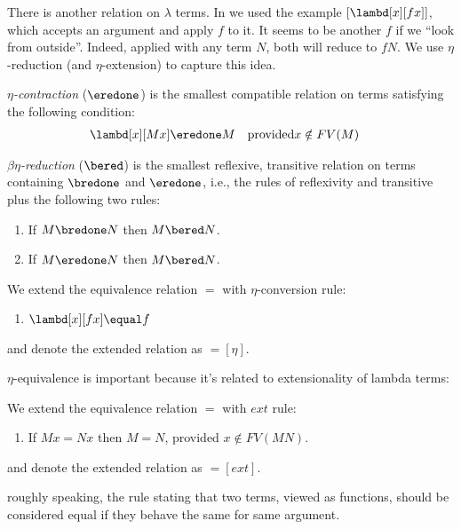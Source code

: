 \documentclass[../../../include/open-logic-section]{subfiles}
\begin{document}

There is another relation on $\lambda$ terms. In
 we used the example $[\lambd[x][fx]]$, which
accepts an argument and apply $f$ to it. 
It seems to be another $f$ if we ``look from outside''.
Indeed, applied with any term $N$, both will reduce to $fN$.
We use $\eta$-reduction (and $\eta$-extension) to
capture this idea.

\begin{defn}
  \emph{$\eta$-contraction} ($\eredone$) is the smallest compatible relation
  on terms satisfying the following condition:
  \begin{align*}
    &\lambd[x][M x] \eredone M && \text{provided} x \notin FV(M)
  \end{align*}
\end{defn}

\begin{defn} 
  \emph{$\beta\eta$-reduction} ($\bered$) is the smallest reflexive,
  transitive relation on terms containing $\bredone$ and $\eredone$,
  i.e., the rules of reflexivity and transitive plus the following two
  rules:
  \begin{enumerate}
  \item If $M \bredone N$ then $M \bered N$. 
  \item If $M \eredone N$ then $M \bered N$. 
  \end{enumerate}
    
\end{defn}

\begin{defn}
  We extend the equivalence relation $\equal$ with $\eta$-conversion rule:
  \begin{enumerate}
  \item $\lambd[x][f x] \equal f$
  \end{enumerate}
  and denote the extended relation as $\equal[\eta]$.
\end{defn}

$\eta$-equivalence is important because it's related to extensionality
of lambda terms:
\begin{defn}[Extensionality]
  We extend the equivalence relation $\equal$ with $ext$ rule:
  \begin{enumerate}
  \item If $Mx \equal Nx$ then $M \equal N$, provided $x \notin FV(MN)$.
  \end{enumerate}
  and denote the extended relation as $\equal[ext]$.
\end{defn}
roughly speaking, the rule stating that two terms, viewed as functions, should be
considered equal if they behave the same for same argument.
\end{document}
